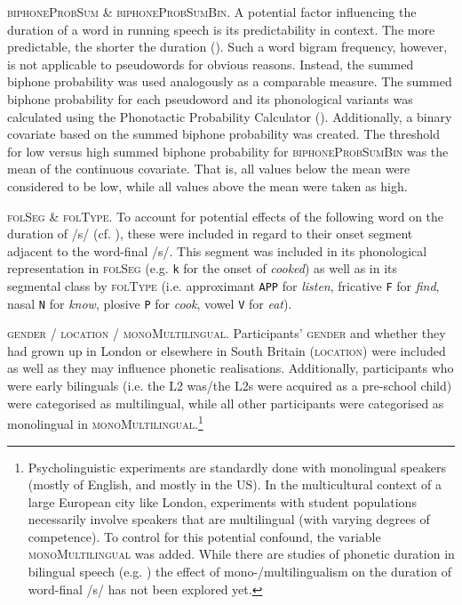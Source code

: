 \textsc{biphoneProbSum} \& \textsc{biphoneProbSumBin}. A potential factor influencing the duration of a word in running speech is its predictability in context. The more predictable, the shorter the duration (\cite{Pluymaekers2005a, Bell2009, Torreira2009}). Such a word bigram frequency, however, is not applicable to pseudowords for obvious reasons. Instead, the summed biphone probability was used analogously as a comparable measure. The summed biphone probability for each pseudoword and its phonological variants was calculated using the Phonotactic Probability Calculator (\cite{Vitevitch2004}). Additionally, a binary covariate based on the summed biphone probability was created. The threshold for low versus high summed biphone probability for \textsc{biphoneProbSumBin} was the mean of the continuous covariate. That is, all values below the mean were considered to be low, while all values above the mean were taken as high.

\textsc{folSeg} \& \textsc{folType}. To account for potential effects of the following word on the duration of /s/ (cf. \cite{Klatt1976, Umeda1977}), these were included in regard to their onset segment adjacent to the word-final /s/. This segment was included in its phonological representation in \textsc{folSeg} (e.g. \texttt{k} for the onset of \textit{cooked}) as well as in its segmental class by \textsc{folType} (i.e. approximant \texttt{APP} for \textit{listen}, fricative \texttt{F} for \textit{find}, nasal \texttt{N} for \textit{know}, plosive \texttt{P} for \textit{cook}, vowel \texttt{V} for \textit{eat}).

\textsc{gender} / \textsc{location} / \textsc{monoMultilingual}. Participants’ \textsc{gender} and whether they had grown up in London or elsewhere in South Britain (\textsc{location}) were included as well as they may influence phonetic realisations. Additionally, participants who were early bilinguals (i.e. the L2 was/the L2s were acquired as a pre-school child) were categorised as multilingual, while all other participants were categorised as monolingual in \textsc{monoMultilingual}.\footnote{Psycholinguistic experiments are standardly done with monolingual speakers (mostly of English, and mostly in the US). In the multicultural context of a large European city like London, experiments with student populations necessarily involve speakers that are multilingual (with varying degrees of competence). To control for this potential confound, the variable \textsc{monoMultilingual} was added. While there are studies of phonetic duration in bilingual speech (e.g. \cite{Mack1982, Lee2012}) the effect of mono-/multilingualism on the duration of word-final /s/ has not been explored yet.}

